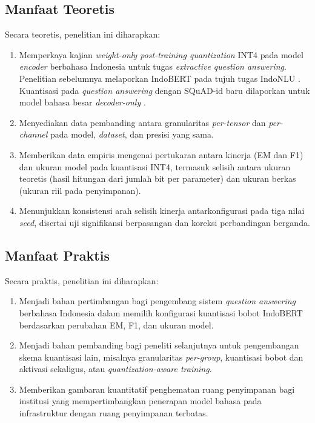\subsection{Manfaat Teoretis}

Secara teoretis, penelitian ini diharapkan:
\begin{enumerate}
    \item Memperkaya kajian \textit{weight-only post-training quantization} INT4 pada model \textit{encoder} berbahasa Indonesia untuk tugas \textit{extractive question answering}. Penelitian sebelumnya melaporkan IndoBERT pada tujuh tugas IndoNLU \parencite{abdurrahman2023implementing}. Kuantisasi pada \textit{question answering} dengan SQuAD-id baru dilaporkan untuk model bahasa besar \textit{decoder-only} \parencite{ramaputra2026evaluating}.
    \item Menyediakan data pembanding antara granularitas \textit{per-tensor} dan \textit{per-channel} pada model, \textit{dataset}, dan presisi yang sama.
    \item Memberikan data empiris mengenai pertukaran antara kinerja (EM dan F1) dan ukuran model pada kuantisasi INT4, termasuk selisih antara ukuran teoretis (hasil hitungan dari jumlah bit per parameter) dan ukuran berkas (ukuran riil pada penyimpanan).
    \item Menunjukkan konsistensi arah selisih kinerja antarkonfigurasi pada tiga nilai \textit{seed}, disertai uji signifikansi berpasangan dan koreksi perbandingan berganda.
\end{enumerate}

\subsection{Manfaat Praktis}

Secara praktis, penelitian ini diharapkan:
\begin{enumerate}
    \item Menjadi bahan pertimbangan bagi pengembang sistem \textit{question answering} berbahasa Indonesia dalam memilih konfigurasi kuantisasi bobot IndoBERT berdasarkan perubahan EM, F1, dan ukuran model.
    \item Menjadi bahan pembanding bagi peneliti selanjutnya untuk pengembangan skema kuantisasi lain, misalnya granularitas \textit{per-group}, kuantisasi bobot dan aktivasi sekaligus, atau \textit{quantization-aware training}.
    \item Memberikan gambaran kuantitatif penghematan ruang penyimpanan bagi institusi yang mempertimbangkan penerapan model bahasa pada infrastruktur dengan ruang penyimpanan terbatas.
\end{enumerate}

